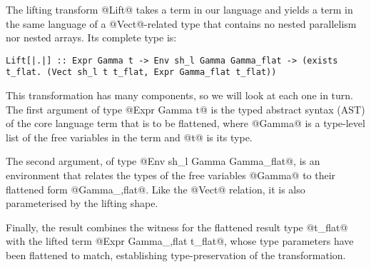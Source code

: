 The lifting transform @Lift@ takes a term in our language and yields a term in the same language of a @Vect@-related type that contains no nested parallelism nor nested arrays. Its complete type is:
%
\begin{lstlisting}[style=ndp]
Lift[|.|] :: Expr Gamma t -> Env sh_l Gamma Gamma_flat -> (exists t_flat. (Vect sh_l t t_flat, Expr Gamma_flat t_flat))
\end{lstlisting}
%
This transformation has many components, so we will look at each one in turn. The first argument of type @Expr Gamma  t@ is the typed abstract syntax (AST) of the core language term that is to be flattened, where @Gamma@ is a type-level list of the free variables in the term and @t@ is its type.

The second argument, of type @Env sh_l  Gamma  Gamma_flat@, is an environment that relates the types of the free variables @Gamma@ to their flattened form @Gamma_,flat@. Like the @Vect@ relation, it is also parameterised by the lifting shape.

Finally, the result combines the witness for the flattened result type @t_flat@ with the lifted term @Expr Gamma_,flat t_flat@, whose type parameters have been flattened to match, establishing type-preservation of the transformation.

